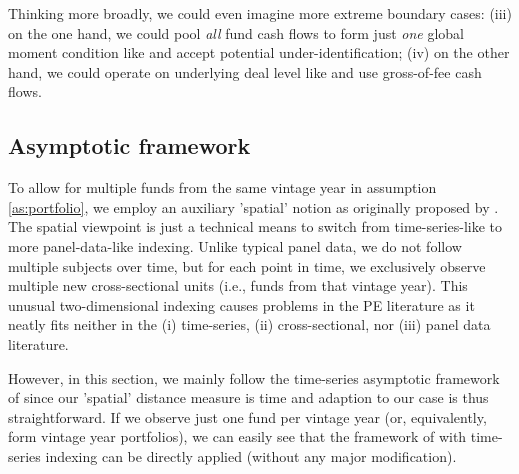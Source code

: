 \documentclass[12pt]{article}
\begin{document}
Thinking more broadly, we could even imagine more extreme boundary cases: 
(iii) on the one hand, we could pool \emph{all} fund cash flows to form just \emph{one} global moment condition like \cite{KN16} and  accept potential under-identification; 
(iv) on the other hand, we could operate on underlying deal level like \cite{B14,B16} and use gross-of-fee cash flows.

\subsection{Asymptotic framework}
\label{sec:asymptotic_framework}

To allow for multiple funds from the same vintage year in assumption \ref{as:portfolio}, we employ an auxiliary 'spatial' notion as originally proposed by \cite{KN16}.
The spatial viewpoint is just a technical means to switch from time-series-like to more panel-data-like indexing.
Unlike typical panel data, we do not follow multiple subjects over time, but for each point in time, we exclusively observe multiple new cross-sectional units (i.e., funds from that vintage year).
This unusual two-dimensional indexing causes problems in the PE literature as it neatly fits neither in the (i) time-series, (ii) cross-sectional, nor (iii) panel data literature.

However, in this section, we mainly follow the time-series asymptotic framework of \cite{PP97} since our 'spatial' distance measure is time and adaption to our case is thus straightforward.
If we observe just one fund per vintage year (or, equivalently, form vintage year portfolios), we can easily see that the framework of \cite{PP97} with time-series indexing can be directly applied (without any major modification).
\end{document}
